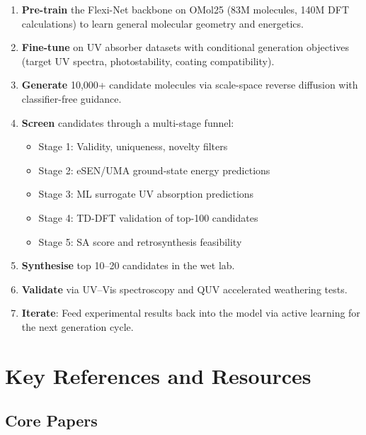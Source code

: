 \documentclass[11pt,a4paper]{article}
\begin{document}
\begin{enumerate}[leftmargin=2em]
  \item \textbf{Pre-train} the Flexi-Net backbone on OMol25 (83M molecules,
    140M DFT calculations) to learn general molecular geometry and
    energetics.
  \item \textbf{Fine-tune} on UV absorber datasets with conditional
    generation objectives (target UV spectra, photostability, coating
    compatibility).
  \item \textbf{Generate} 10,000+ candidate molecules via scale-space
    reverse diffusion with classifier-free guidance.
  \item \textbf{Screen} candidates through a multi-stage funnel:
    \begin{itemize}
      \item Stage 1: Validity, uniqueness, novelty filters
      \item Stage 2: eSEN/UMA ground-state energy predictions
      \item Stage 3: ML surrogate UV absorption predictions
      \item Stage 4: TD-DFT validation of top-100 candidates
      \item Stage 5: SA score and retrosynthesis feasibility
    \end{itemize}
  \item \textbf{Synthesise} top 10--20 candidates in the wet lab.
  \item \textbf{Validate} via UV--Vis spectroscopy and QUV accelerated
    weathering tests.
  \item \textbf{Iterate}: Feed experimental results back into the model
    via active learning for the next generation cycle.
\end{enumerate}

\section{Key References and Resources}

\subsection{Core Papers}
\end{document}

